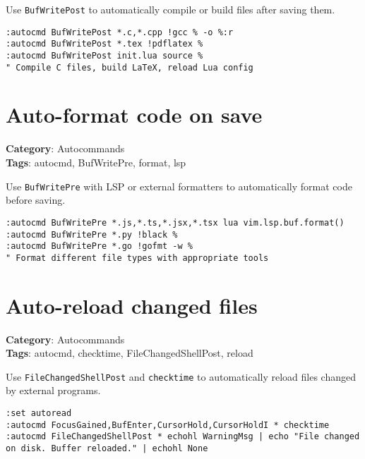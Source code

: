 {Use {\footnotesize \Verb§BufWritePost§} to automatically compile or build files after saving them.

\begin{Exa*}{}
\begin{Verbatim}[fontsize=\footnotesize, breaklines, breakanywhere]
:autocmd BufWritePost *.c,*.cpp !gcc % -o %:r
:autocmd BufWritePost *.tex !pdflatex %
:autocmd BufWritePost init.lua source %
" Compile C files, build LaTeX, reload Lua config
\end{Verbatim}
\end{Exa*}

\section{Auto-format code on save}

\textbf{Category}: Autocommands\\ \textbf{Tags}: autocmd, BufWritePre, format, lsp
\vspace{0.5cm}

Use {\footnotesize \Verb§BufWritePre§} with LSP or external formatters to automatically format code before saving.

\begin{Exa*}{}
\begin{Verbatim}[fontsize=\footnotesize, breaklines, breakanywhere]
:autocmd BufWritePre *.js,*.ts,*.jsx,*.tsx lua vim.lsp.buf.format()
:autocmd BufWritePre *.py !black %
:autocmd BufWritePre *.go !gofmt -w %
" Format different file types with appropriate tools
\end{Verbatim}
\end{Exa*}

\section{Auto-reload changed files}

\textbf{Category}: Autocommands\\ \textbf{Tags}: autocmd, checktime, FileChangedShellPost, reload
\vspace{0.5cm}

Use {\footnotesize \Verb§FileChangedShellPost§} and {\footnotesize \Verb§checktime§} to automatically reload files changed by external programs.

\begin{Exa*}{}
\begin{Verbatim}[fontsize=\footnotesize, breaklines, breakanywhere]
:set autoread
:autocmd FocusGained,BufEnter,CursorHold,CursorHoldI * checktime
:autocmd FileChangedShellPost * echohl WarningMsg | echo "File changed on disk. Buffer reloaded." | echohl None
\end{Verbatim}
\end{Exa*}

}
